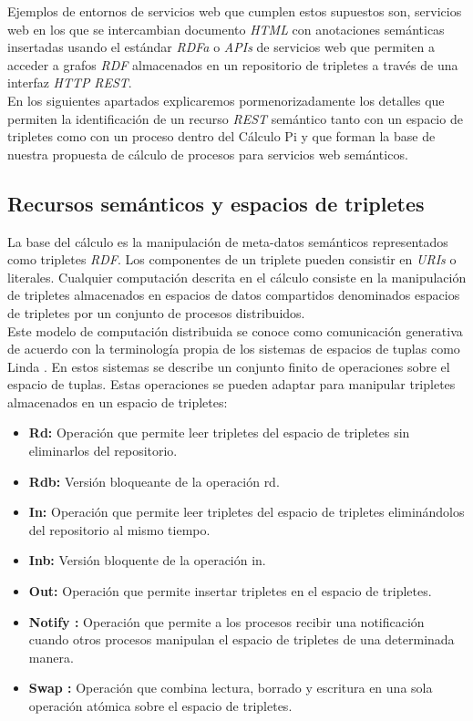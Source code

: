 Ejemplos de entornos de servicios web que cumplen estos supuestos son, servicios web en los que se intercambian documento \textit{HTML} con anotaciones sem\'anticas insertadas usando el est\'andar \textit{RDFa} o \textit{APIs} de servicios web que permiten a acceder a grafos \textit{RDF} almacenados en un repositorio de tripletes a trav\'es de una interfaz \textit{HTTP} \textit{REST}.\\
En los siguientes apartados explicaremos pormenorizadamente los detalles que permiten la identificaci\'on de un recurso \textit{REST} sem\'antico tanto con un espacio de tripletes como con un proceso dentro del C\'alculo Pi y que forman la base de nuestra propuesta de c\'alculo de procesos para servicios web sem\'anticos.

\subsection{Recursos sem\'anticos y espacios de tripletes}

La base del c\'alculo es la manipulaci\'on de meta-datos sem\'anticos representados como tripletes \textit{RDF}. Los componentes de un triplete pueden consistir en \textit{URIs} o literales. Cualquier computaci\'on descrita en el c\'alculo consiste en la manipulaci\'on de tripletes almacenados en espacios de datos compartidos denominados espacios de tripletes \cite{fensel2004triple} por un conjunto de procesos distribuidos.\\
Este modelo de computaci\'on distribuida se conoce como comunicaci\'on generativa de acuerdo con la terminolog\'ia propia de los sistemas de espacios de tuplas como Linda \cite{linda}. En estos sistemas se describe un conjunto finito de operaciones sobre el espacio de tuplas. Estas operaciones se pueden adaptar para manipular tripletes almacenados en un espacio de tripletes:

\begin{itemize}
\item \textbf{Rd:} Operaci\'on que permite leer tripletes del espacio de tripletes sin eliminarlos del repositorio. 
\item \textbf{Rdb:} Versi\'on bloqueante de la operaci\'on rd.
\item \textbf{In:} Operaci\'on que permite leer tripletes del espacio de tripletes elimin\'andolos del repositorio al mismo tiempo.
\item \textbf{Inb:} Versi\'on bloquente de la operaci\'on in.
\item \textbf{Out:} Operaci\'on que permite insertar tripletes en el espacio de tripletes.
\item \textbf{Notify \cite{busi2000process}:} Operaci\'on que permite a los procesos recibir una notificaci\'on cuando otros procesos manipulan el espacio de tripletes de una determinada manera.
\item \textbf{Swap \cite{bessani2008depspace}:} Operaci\'on que combina lectura, borrado y escritura en una sola operaci\'on at\'omica sobre el espacio de tripletes.

\end{itemize}

